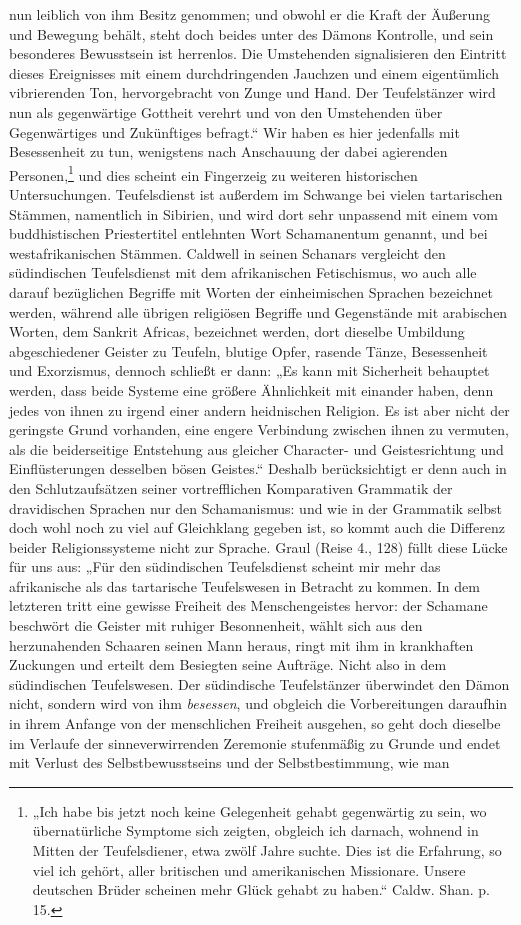 \documentclass{article}
\begin{document}
nun leiblich von ihm Besitz genommen; und obwohl er die Kraft der Äußerung und Bewegung behält, steht doch beides unter des Dämons Kontrolle, und sein besonderes Bewusstsein ist herrenlos. Die Umstehenden signalisieren den Eintritt dieses Ereignisses mit einem durchdringenden Jauchzen und einem eigentümlich vibrierenden Ton, hervorgebracht von Zunge und Hand. Der Teufelstänzer wird nun als gegenwärtige Gottheit verehrt und von den Umstehenden über Gegenwärtiges und Zukünftiges befragt.“ Wir haben es hier jedenfalls mit Besessenheit zu tun, wenigstens nach Anschauung der dabei agierenden Personen,\footnote{„Ich habe bis jetzt noch keine Gelegenheit gehabt gegenwärtig zu sein, wo übernatürliche Symptome sich zeigten, obgleich ich darnach, wohnend in Mitten der Teufelsdiener, etwa zwölf Jahre suchte. Dies ist die Erfahrung, so viel ich gehört, aller britischen und amerikanischen Missionare. Unsere deutschen Brüder scheinen mehr Glück gehabt zu haben.“ Caldw. Shan. p. 15.} und dies scheint ein Fingerzeig zu weiteren historischen Untersuchungen. Teufelsdienst ist außerdem im Schwange bei vielen tartarischen Stämmen, namentlich in Sibirien, und wird dort sehr unpassend mit einem vom buddhistischen Priestertitel entlehnten Wort Schamanentum genannt, und bei westafrikanischen Stämmen. Caldwell in seinen Schanars vergleicht den südindischen Teufelsdienst mit dem afrikanischen Fetischismus, wo auch alle darauf bezüglichen Begriffe mit Worten der einheimischen Sprachen bezeichnet werden, während alle übrigen religiösen Begriffe und Gegenstände mit arabischen Worten, dem Sankrit Africas, bezeichnet werden, dort dieselbe Umbildung abgeschiedener Geister zu Teufeln, blutige Opfer, rasende Tänze, Besessenheit und Exorzismus, dennoch schließt er dann: „Es kann mit Sicherheit behauptet werden, dass beide Systeme eine größere Ähnlichkeit mit einander haben, denn jedes von ihnen zu irgend einer andern heidnischen Religion. Es ist aber nicht der geringste Grund vorhanden, eine engere Verbindung zwischen ihnen zu vermuten, als die beiderseitige Entstehung aus gleicher Character- und Geistesrichtung und Einflüsterungen desselben bösen Geistes.“ Deshalb berücksichtigt er denn auch in den Schlutzaufsätzen seiner vortrefflichen Komparativen Grammatik der dravidischen Sprachen nur den Schamanismus: und wie in der Grammatik selbst doch wohl noch zu viel auf Gleichklang gegeben ist, so kommt auch die Differenz beider Religionssysteme nicht zur Sprache. Graul (Reise 4., 128) füllt diese Lücke für uns aus: „Für den südindischen Teufelsdienst scheint mir mehr das afrikanische als das tartarische Teufelswesen in Betracht zu kommen. In dem letzteren tritt eine gewisse Freiheit des Menschengeistes hervor: der Schamane beschwört die Geister mit ruhiger Besonnenheit, wählt sich aus den herzunahenden Schaaren seinen Mann heraus, ringt mit ihm in krankhaften Zuckungen und erteilt dem Besiegten seine Aufträge. Nicht also in dem südindischen Teufelswesen. Der südindische Teufelstänzer überwindet den Dämon nicht, sondern wird von ihm \emph{besessen}, und obgleich die Vorbereitungen daraufhin in ihrem Anfange von der menschlichen Freiheit ausgehen, so geht doch dieselbe im Verlaufe der sinneverwirrenden Zeremonie stufenmäßig zu Grunde und endet mit Verlust des Selbstbewusstseins und der Selbstbestimmung, wie man 
\end{document}

